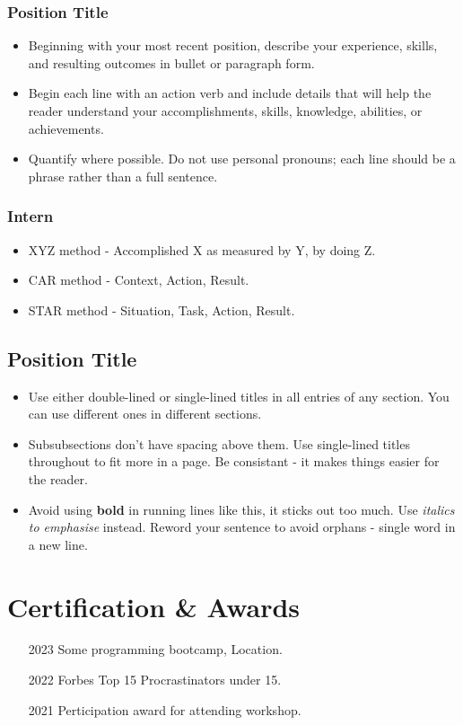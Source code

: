 \documentclass[11pt]{article}
\begin{document}
\subsubsection{Position Title }
\begin{itemize}
	\item Beginning with your most recent position, describe your experience, skills, and resulting outcomes in bullet or paragraph form.
	\item Begin each line with an action verb and include details that will help the reader understand your accomplishments, skills, knowledge, abilities, or achievements.
	\item Quantify where possible. Do not use personal pronouns; each line should be a phrase rather than a full sentence.
\end{itemize}

\subsubsection{Intern }
\begin{itemize}
	\item XYZ method - Accomplished X as measured by Y, by doing Z.
	\item CAR method - Context, Action, Result. 
	\item STAR method - Situation, Task, Action, Result.
\end{itemize}

\subsection{Position Title  }
\begin{itemize}
	\item Use either double-lined or single-lined titles in all entries of any section. You can use different ones in different sections.
	\item Subsubsections don't have spacing above them. Use single-lined titles throughout to fit more in a page. Be consistant - it makes things easier for the reader.
	\item Avoid using \textbf{bold} in running lines like this, it sticks out too much. Use \textit{italics to emphasise} instead. Reword your sentence to avoid orphans - single word in a new line.
\end{itemize}


\section{Certification \& Awards}
\begin{enumerate}
	\item[2023] Some programming bootcamp, Location.
	\item[2022] Forbes Top 15 Procrastinators under 15.
	\item[2021] Perticipation award for attending workshop.
\end{enumerate}
\end{document}
